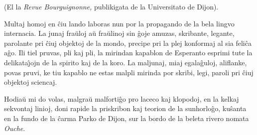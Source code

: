\begin{center}
\footnotesize (El la \emph{Revue Bourguignonne,} publikigata de la Universitato de
Dijon).
\end{center}

   Multaj homoj en \^ciu lando laboras nun por la propagando de la bela
lingvo internacia. La junaj fra\u uloj a\u u fra\u ulinoj sin \^goje
amuzas, skribante, legante, parolante pri \^ciuj objektoj de la
mondo, precipe pri la plej konformaj al sia feli\^ca a\^go. Ili tiel
pruvas, pli kaj pli, la mirindan kapablon de Esperanto esprimi tute
la delikata\^{\j}ojn de la spirito kaj de la koro. La maljunaj, miaj
egala\^guloj, aliflanke, povas pruvi, ke tiu kapablo ne estas malpli
mirinda por skribi, legi, paroli pri \^ciuj objektoj sciencaj.

   Hodia\u u mi do volas, malgra\u u malforti\^go pro laceco kaj klopodoj, en
la kelkaj sekvontaj linioj, doni rapide la priskribon kaj teorion de
la sunhorlo\^go, ku\^santa en la fundo de la \^carma Parko de Dijon,
sur la bordo de la beleta rivero nomata {\sl Ouche}.

